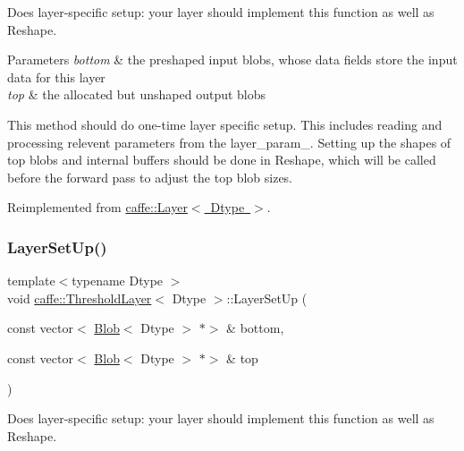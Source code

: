 Does layer-\/specific setup\+: your layer should implement this function as well as Reshape. 


\begin{DoxyParams}{Parameters}
{\em bottom} & the preshaped input blobs, whose data fields store the input data for this layer \\
\hline
{\em top} & the allocated but unshaped output blobs\\
\hline
\end{DoxyParams}
This method should do one-\/time layer specific setup. This includes reading and processing relevent parameters from the {\ttfamily layer\+\_\+param\+\_\+}. Setting up the shapes of top blobs and internal buffers should be done in {\ttfamily Reshape}, which will be called before the forward pass to adjust the top blob sizes. 

Reimplemented from \mbox{\hyperlink{classcaffe_1_1_layer_a481323a3e0972c682787f2137468c29f}{caffe\+::\+Layer$<$ Dtype $>$}}.

\mbox{\label{classcaffe_1_1_threshold_layer_a14e3782a6bea7bba511f3d6f23344037}} 
\subsubsection{\texorpdfstring{Layer\+Set\+Up()}{LayerSetUp()}\hspace{0.1cm}{\footnotesize\ttfamily [2/2]}}
{\footnotesize\ttfamily template$<$typename Dtype $>$ \\
void \mbox{\hyperlink{classcaffe_1_1_threshold_layer}{caffe\+::\+Threshold\+Layer}}$<$ Dtype $>$\+::Layer\+Set\+Up (\begin{DoxyParamCaption}\item[{const vector$<$ \mbox{\hyperlink{classcaffe_1_1_blob}{Blob}}$<$ Dtype $>$ $\ast$$>$ \&}]{bottom,  }\item[{const vector$<$ \mbox{\hyperlink{classcaffe_1_1_blob}{Blob}}$<$ Dtype $>$ $\ast$$>$ \&}]{top }\end{DoxyParamCaption})\hspace{0.3cm}{\ttfamily [virtual]}}



Does layer-\/specific setup\+: your layer should implement this function as well as Reshape. 


